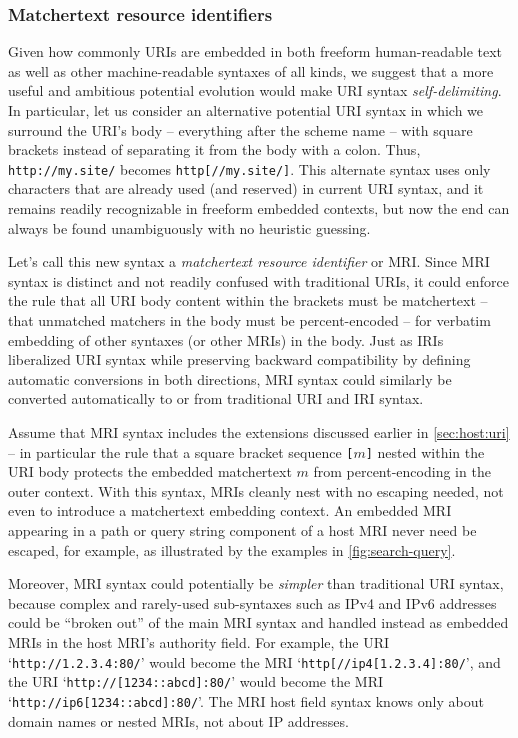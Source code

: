 \subsubsection{Matchertext resource identifiers}
\label{sec:embed:mri}

Given how commonly URIs are embedded in both freeform human-readable text
as well as other machine-readable syntaxes of all kinds,
we suggest that a more useful and ambitious potential evolution
would make URI syntax \emph{self-delimiting}.
In particular,
let us consider an alternative potential URI syntax
in which we surround the URI's body -- everything after the scheme name --
with square brackets instead of separating it from the body with a colon.
Thus, \verb|http://my.site/| becomes \verb|http[//my.site/]|.
This alternate syntax uses only characters
that are already used (and reserved) in current URI syntax,
and it remains readily recognizable in freeform embedded contexts,
but now the end can always be found unambiguously with no heuristic guessing.

Let's call this new syntax
a \emph{matchertext resource identifier} or MRI.
Since MRI syntax is distinct and not readily confused with traditional URIs,
it could enforce the rule that all URI body content within the brackets
must be matchertext --
\ie that unmatched matchers in the body must be percent-encoded --
for verbatim embedding of other syntaxes (or other MRIs) in the body.
Just as IRIs~\cite{rfc3987} liberalized URI syntax
while preserving backward compatibility
by defining automatic conversions in both directions,
MRI syntax could similarly be converted automatically
to or from traditional URI and IRI syntax.

Assume that MRI syntax includes the extensions
discussed earlier in \cref{sec:host:uri} --
in particular the rule that a square bracket sequence \verb|[|$m$\verb|]|
nested within the URI body protects the embedded matchertext $m$
from percent-encoding in the outer context.
With this syntax, MRIs cleanly nest with no escaping needed,
not even to introduce a matchertext embedding context.
An embedded MRI appearing in a path or query string component
of a host MRI never need be escaped, for example,
as illustrated by the examples in \cref{fig:search-query}.

Moreover, MRI syntax could potentially be \emph{simpler}
than traditional URI syntax,
because complex and rarely-used sub-syntaxes such as IPv4 and IPv6 addresses
could be ``broken out'' of the main MRI syntax
and handled instead as embedded MRIs in the host MRI's authority field.
For example,
the URI `\verb|http://1.2.3.4:80/|' would become
the MRI `\verb|http[//ip4[1.2.3.4]:80/|', and
the URI `\verb|http://[1234::abcd]:80/|' would become
the MRI `\verb|http://ip6[1234::abcd]:80/|'.
The MRI host field syntax knows only about domain names or nested MRIs,
not about IP addresses.



